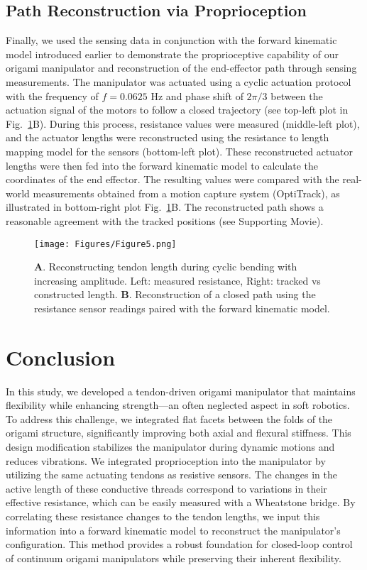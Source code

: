 \documentclass[journal, letterpaper]{IEEEtran}
\begin{document}
\subsection{Path Reconstruction via Proprioception}

Finally, we used the sensing data in conjunction with the forward kinematic model introduced earlier to demonstrate the proprioceptive capability of our origami manipulator and reconstruction of the end-effector path through sensing measurements.
The manipulator was actuated using a cyclic actuation protocol with the frequency of $f=0.0625$ Hz and phase shift of $2\pi/3$ between the actuation signal of the motors to follow a closed trajectory (see top-left plot in Fig.~\ref{Fig5}B). During this process, resistance values were measured (middle-left plot), and the actuator lengths were reconstructed using the resistance to length mapping model for the sensors (bottom-left plot). These reconstructed actuator lengths were then fed into the forward kinematic model to calculate the coordinates of the end effector. The resulting values were compared with the real-world measurements obtained from a motion capture system (OptiTrack), as illustrated in bottom-right plot Fig.~\ref{Fig5}B. The reconstructed path shows a reasonable agreement with the tracked positions (see Supporting Movie). 


\begin{figure}[tb]
\centering
\texttt{[image: Figures/Figure5.png]}
\caption{\textbf{A}. Reconstructing tendon length during cyclic bending with increasing amplitude. Left: measured resistance, Right: tracked vs constructed length.  \textbf{B}. Reconstruction of a closed path using the resistance sensor readings paired with the forward kinematic model. }
\label{Fig5}
\end{figure}

\section{Conclusion}
In this study, we developed a tendon-driven origami manipulator that maintains flexibility while enhancing strength—an often neglected aspect in soft robotics. To address this challenge, we integrated flat facets between the folds of the origami structure, significantly improving both axial and flexural stiffness. This design modification stabilizes the manipulator during dynamic motions and reduces vibrations.
We integrated proprioception into the manipulator by utilizing the same actuating tendons as resistive sensors. The changes in the active length of these conductive threads correspond to variations in their effective resistance, which can be easily measured with a Wheatstone bridge. By correlating these resistance changes to the tendon lengths, we input this information into a forward kinematic model to reconstruct the manipulator's configuration. This method provides a robust foundation for closed-loop control of continuum origami manipulators while preserving their inherent flexibility. 
\end{document}
